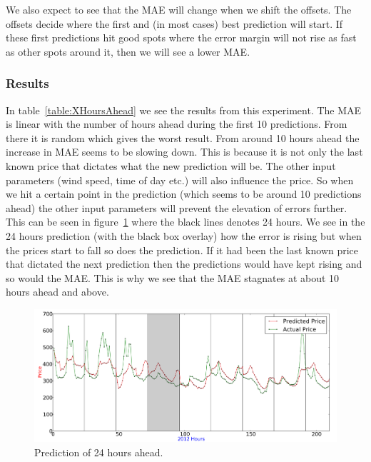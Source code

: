We also expect to see that the MAE will change when we shift the offsets. The offsets decide where the first and (in most cases) best prediction will start. If these first predictions hit good spots where the error margin will not rise as fast as other spots around it, then we will see a lower MAE.

\subsubsection{Results}
In table~\ref{table:XHoursAhead} we see the results from this experiment. The MAE is linear with the number of hours ahead during the first 10 predictions. From there it is random which gives the worst result. From around 10 hours ahead the increase in MAE seems to be slowing down. This is because it is not only the last known price that dictates what the new prediction will be. The other input parameters (wind speed, time of day etc.) will also influence the price. So when we hit a certain point in the prediction (which seems to be around 10 predictions ahead) the other input parameters will prevent the elevation of errors further. This can be seen in figure~\ref{fig:24HoursAhead_elevationOfError} where the black lines denotes 24 hours. We see in the 24 hours prediction (with the black box overlay) how the error is rising but when the prices start to fall so does the prediction. If it had been the last known price that dictated the next prediction then the predictions would have kept rising and so would the MAE. This is why we see that the MAE stagnates at about 10 hours ahead and above.

\begin{figure}[H]
\centering
\includegraphics[width=\linewidth]{billeder/PriceExperimentalAnalysis/24HoursAhead_ElevationOfErrorExample.png}
\caption{Prediction of 24 hours ahead.}
\label{fig:24HoursAhead_elevationOfError}
\end{figure}

